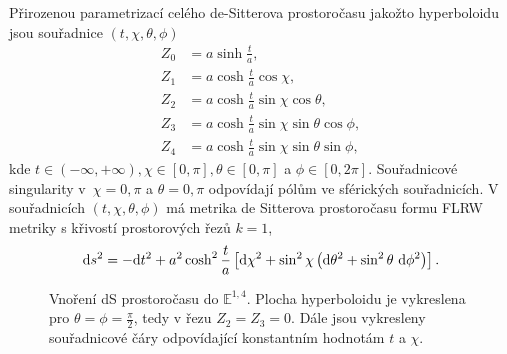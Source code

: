 Přirozenou parametrizací celého de-Sitterova prostoročasu jakožto hyperboloidu jsou souřadnice $(t, \chi, \theta, \phi)$
\begin{equation}
     \begin{split}
          Z_0 &= a \sinh \frac{t}{a}, \\
          Z_1 &= a \cosh \frac{t}{a} \cos \chi, \\
          Z_2 &= a \cosh \frac{t}{a} \sin \chi \cos \theta, \\
          Z_3 &= a \cosh \frac{t}{a} \sin \chi \sin \theta \cos \phi, \\
          Z_4 &= a \cosh \frac{t}{a} \sin \chi \sin \theta \sin \phi,
     \end{split}
\end{equation}
kde $t \in \left(-\infty, +\infty\right), \chi \in \left[0, \pi\right], \theta \in \left[0, \pi \right]$ a
$\phi \in \left[0, 2\pi\right]$. Souřadnicové singularity v~$\chi = 0, \pi$ a $\theta = 0, \pi$ odpovídají pólům
ve sférických souřadnicích.
V souřadnicích $(t, \chi, \theta, \phi)$ má metrika de Sitterova prostoročasu formu FLRW metriky s
křivostí prostorových řezů $k=1$,
\begin{equation}
     \mathrm{d} s^2 = - \mathrm{d} t^2 + a^2 \cosh^2 \frac{t}{a} \left[\mathrm{d} \chi^2 + \sin^2 \chi \left( \mathrm{d} \theta^2 + \sin^2 \theta ~ \mathrm{d} \phi^2\right) \right].
\end{equation}

\begin{figure}[H]
     \centering
     \caption{Vnoření dS prostoročasu do $\mathbb{E}^{1,4}$. Plocha hyperboloidu je vykreslena pro $\theta=\phi=\frac{\pi}{2}$, tedy v řezu $Z_2 = Z_3 = 0$. Dále jsou vykresleny souřadnicové
              čáry odpovídající konstantním hodnotám $t$ a $\chi$.}
\end{figure}


